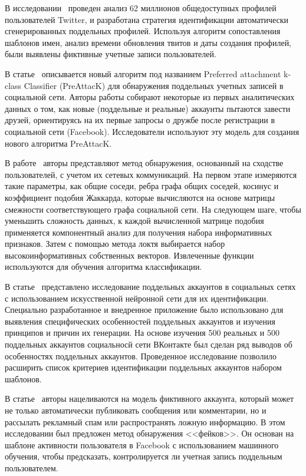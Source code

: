 В исследовании~\cite{GurajalaWHM15} проведен анализ 62 миллионов общедоступных профилей пользователей Twitter, и разработана стратегия идентификации автоматически сгенерированных поддельных профилей. Используя алгоритм сопоставления шаблонов имен, анализ времени обновления твитов и даты создания профилей, были выявлены фиктивные учетные записи пользователей.

В статье~\cite{abs-2308-05353} описывается новый алгоритм под названием Preferred attachment k-class Classifier (PreAttacK) для обнаружения поддельных учетных записей в социальной сети. Авторы работы собирают некоторые из первых аналитических данных о том, как новые (поддельные и реальные) аккаунты пытаются завести друзей, ориентируясь на их первые запросы о дружбе после регистрации в социальной сети (Facebook). Исследователи используют эту модель для создания нового алгоритма PreAttacK. 

В работе~\cite{MohammadrezaeiS19} авторы представляют метод обнаружения, основанный на сходстве пользователей, с учетом их сетевых коммуникаций. На первом
этапе измеряются такие параметры, как общие соседи, ребра графа общих соседей, косинус и коэффициент подобия Жаккарда, которые вычисляются на основе матрицы смежности соответствующего графа социальной сети. На следующем шаге, чтобы уменьшить сложность данных, к каждой вычисленной матрице подобия применяется компонентный анализ для получения набора информативных признаков. Затем с помощью метода локтя выбирается набор высокоинформативных собственных векторов. Извлеченные функции используются для обучения алгоритма классификации. 

В статье~\cite{StolbovaGI21} представлено исследование поддельных аккаунтов в социальных сетях с использованием искусственной нейронной сети для их идентификации. Специально разработанное и внедренное приложение было использовано для выявления специфических особенностей поддельных аккаунтов и изучения принципов и причин их генерации. На основе изучения 500 реальных и 500 поддельных аккаунтов социальносй сети ВКонтакте был сделан ряд выводов об особенностях поддельных аккаунтов. Проведенное исследование позволило расширить список критериев идентификации поддельных аккаунтов набором шаблонов.

В статье~\cite{ChenW18} авторы нацеливаются на модель фиктивного аккаунта, который может не только автоматически публиковать сообщения или комментарии, но и рассылать рекламный спам или распространять ложную информацию. В этом исследовании был предложен метод обнаружения <<фейков>>. Он основан на шаблоне активности пользователя в Facebook с использованием машинного обучения, чтобы предсказать, контролируется ли учетная запись поддельным пользователем.

